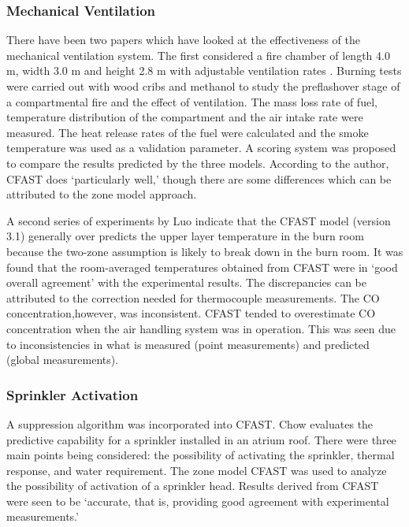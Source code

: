 \subsubsection{Mechanical Ventilation}

There have been two papers which have looked at the effectiveness of the mechanical ventilation system. The first considered a fire chamber of length 4.0 m, width 3.0 m and height 2.8 m with adjustable ventilation rates \cite{Chow:1995a}. Burning tests were carried out with wood cribs and methanol to study the preflashover stage of a compartmental fire and the effect of ventilation. The mass loss rate of fuel, temperature distribution of the compartment and the air intake rate were measured. The heat release rates of the fuel were calculated and the smoke temperature was used as a validation parameter. A scoring system was proposed to compare the results predicted by the three models. According to the author, CFAST does `particularly well,' though there are some differences which can be attributed to the zone model approach.

A second series of experiments by Luo \cite{Luo:1997} indicate that the CFAST model (version 3.1) generally over predicts the upper layer temperature in the burn room because the two-zone assumption is likely to break down in the burn room. It was found that the room-averaged temperatures obtained from CFAST were in `good overall agreement' with the experimental results. The discrepancies can be attributed to the correction needed for thermocouple measurements. The CO concentration,however, was inconsistent. CFAST tended to overestimate CO concentration when the air handling system was in operation. This was seen due to inconsistencies in what is measured (point measurements) and predicted (global measurements).

\subsubsection{Sprinkler Activation}


A suppression algorithm \cite{Madrzykowski:1992} was incorporated into CFAST. Chow \cite{Chow:1996a} evaluates the predictive capability for a sprinkler installed in an atrium roof. There were three main points being considered: the possibility of activating the sprinkler, thermal response, and water requirement. The zone model CFAST was used to analyze the possibility of activation of a sprinkler head. Results derived from CFAST were seen to be `accurate, that is, providing good agreement with experimental measurements.'

